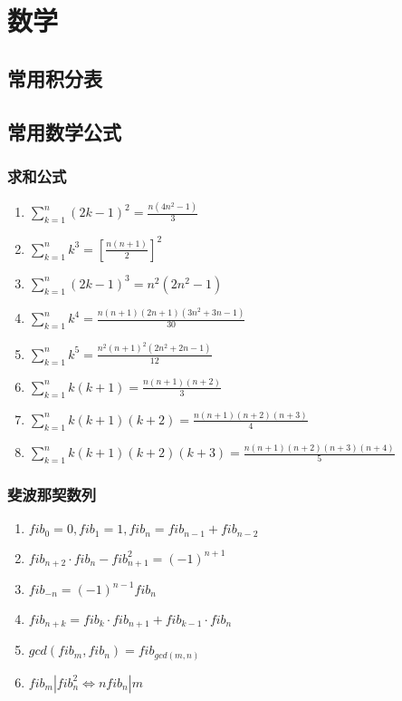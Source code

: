\documentclass[a4paper]{article}
\begin{document}
\section{数学}

\subsection{常用积分表}

\subsection{常用数学公式}

\subsubsection{求和公式}

\begin{enumerate}
	\item $\sum_{k=1}^{n}(2k-1)^2 = \frac{n(4n^2-1)}{3}	$
	\item $\sum_{k=1}^{n}k^3 = [\frac{n(n+1)}{2}]^2	$
	\item $\sum_{k=1}^{n}(2k-1)^3 = n^2(2n^2-1)	$
	\item $\sum_{k=1}^{n}k^4 = \frac{n(n+1)(2n+1)(3n^2+3n-1)}{30}  $
	\item $\sum_{k=1}^{n}k^5 = \frac{n^2(n+1)^2(2n^2+2n-1)}{12}	$
	\item $\sum_{k=1}^{n}k(k+1) = \frac{n(n+1)(n+2)}{3}	$
	\item $\sum_{k=1}^{n}k(k+1)(k+2) = \frac{n(n+1)(n+2)(n+3)}{4} $
	\item $\sum_{k=1}^{n}k(k+1)(k+2)(k+3) = \frac{n(n+1)(n+2)(n+3)(n+4)}{5} $
\end{enumerate}

\subsubsection{斐波那契数列}

\begin{enumerate}
	\item $fib_0=0, fib_1=1, fib_n=fib_{n-1}+fib_{n-2}$
	\item $fib_{n+2} \cdot fib_n-fib_{n+1}^2=(-1)^{n+1}$
	\item $fib_{-n}=(-1)^{n-1}fib_n$
	\item $fib_{n+k}=fib_k \cdot fib_{n+1}+fib_{k-1} \cdot fib_n$
	\item $gcd(fib_m, fib_n)=fib_{gcd(m, n)}$
	\item $fib_m|fib_n^2\Leftrightarrow nfib_n|m$
\end{enumerate}
\end{document}
